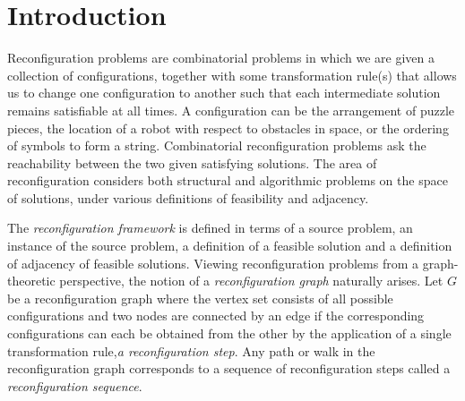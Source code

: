 \chapter{Introduction}\label{ch:intro}
Reconfiguration problems are combinatorial problems in which we are given a collection of configurations, together with some
transformation rule(s) that allows us to change one configuration to another such that each intermediate solution remains satisfiable at all times.
A configuration can be the arrangement of puzzle pieces, the location of a robot with respect to obstacles in space, or the ordering of symbols to
form a string. Combinatorial reconfiguration problems ask the reachability between the two given satisfying solutions. The area of reconfiguration
considers both structural and algorithmic problems on the space of solutions, under various definitions of feasibility and adjacency.


The \textit{reconfiguration framework} is defined in terms of a source problem, an instance of the source problem, a definition of a feasible solution
and a definition of adjacency of feasible solutions. Viewing reconfiguration problems from a graph-theoretic perspective, the notion of a
\textit{reconfiguration graph} naturally arises. Let $G$ be a reconfiguration graph where the vertex set consists of all
possible configurations and two nodes are connected by an edge if the corresponding configurations can each be obtained from the other by the
application of a single transformation rule,\textit{a reconfiguration step}. Any path or walk in the reconfiguration graph corresponds to a
sequence of reconfiguration steps called a \textit{reconfiguration sequence}.

